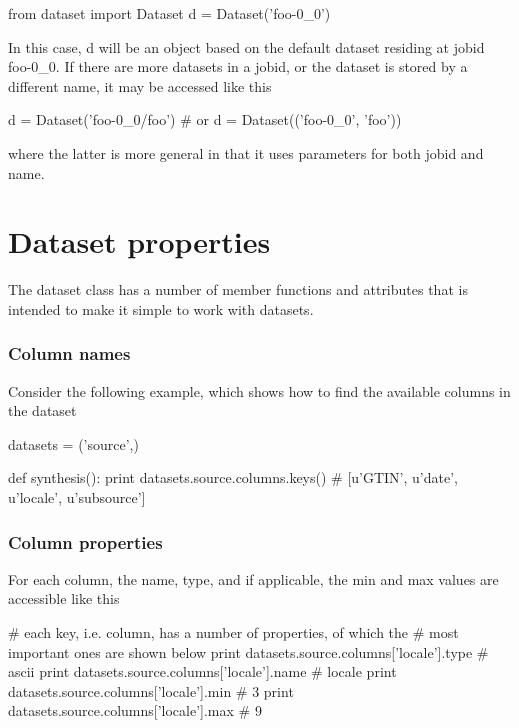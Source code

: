 \begin{python}
from dataset import Dataset
d = Dataset('foo-0_0')
\end{python}
In this case, d will be an object based on the default dataset
residing at jobid foo-0\_0.  If there are more datasets in a jobid, or
the dataset is stored by a different name, it may be accessed like
this

\begin{python}
d = Dataset('foo-0_0/foo')
# or
d = Dataset(('foo-0_0', 'foo'))
\end{python}
where the latter is more general in that it uses parameters for both
jobid and name.



\newpage
\section{Dataset properties}

The dataset class has a number of member functions and attributes that
is intended to make it simple to work with datasets.



\subsubsection{Column names}

Consider the
following example, which shows how to find the available columns in
the dataset

\begin{python}
datasets = ('source',)

def synthesis():
  print datasets.source.columns.keys()
  # [u'GTIN', u'date', u'locale', u'subsource']
\end{python}



\subsubsection{Column properties}

For each column, the name, type, and if applicable, the min and max
values are accessible like this

\begin{python}
# each key, i.e. column, has a number of properties, of which the
# most important ones are shown below
print datasets.source.columns['locale'].type
# ascii
print datasets.source.columns['locale'].name
# locale
print datasets.source.columns['locale'].min
# 3
print datasets.source.columns['locale'].max
# 9
\end{python}

